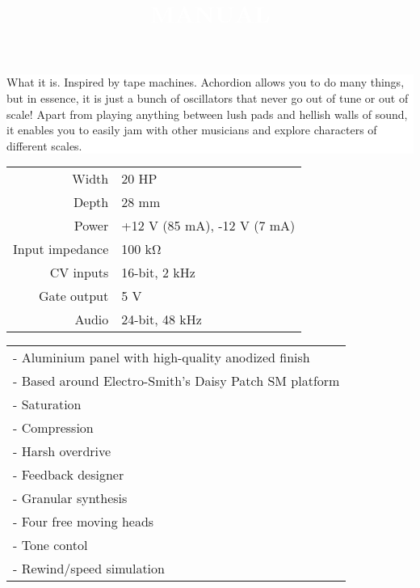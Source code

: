 \documentclass[11pt]{article}
\begin{document}
\pagecolor{black}\afterpage{\nopagecolor}

\title{\textcolor{white}{MANUAL}}
\author{}
\date{}

\begin{minipage}{0.4\textwidth}
\color{white}
\maketitle

\noindent\colorbox{white}
{
\begin{minipage}{0.85\textwidth}\color{black}
What it is. Inspired by tape machines. Achordion allows you to do many things, but in essence, it is just a bunch of oscillators that never go out of tune or out of scale! Apart from playing anything between lush pads and hellish walls of sound, it enables you to easily jam with other musicians and explore characters of different scales.
\end{minipage}
}

\vspace{1cm}

\begin{minipage}{0.8\textwidth}\color{white}
\begin{tabular}{@{}rl@{}}
  Width & 20 HP \\
  Depth & 28 mm \\
  Power & +12 V (85 mA), -12 V (7 mA) \\
  Input impedance & 100 kΩ \\
  CV inputs & 16-bit, 2 kHz \\
  Gate output & 5 V \\
  Audio & 24-bit, 48 kHz
\end{tabular}
\end{minipage}

\vspace{1cm}

\begin{minipage}{0.8\textwidth}\color{white}
\begin{tabular}{@{}l}
  - Aluminium panel with high-quality anodized finish \\
  - Based around Electro-Smith's Daisy Patch SM platform \\
  - Saturation \\
  - Compression \\
  - Harsh overdrive \\
  - Feedback designer \\
  - Granular synthesis \\
  - Four free moving heads \\
  - Tone contol \\
  - Rewind/speed simulation
\end{tabular}
\end{minipage}

\end{minipage}%
\end{document}
